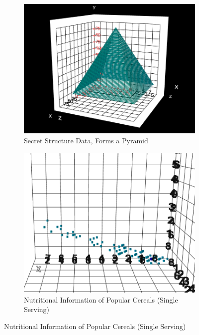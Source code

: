 \begin{figure}[hbt!]
    \centering
    \begin{subfigure}
        \centering
        \includegraphics[width=1\columnwidth]{author-files/figures/pyramid.PNG}
        \caption{Secret Structure Data, Forms a Pyramid}
        \label{fig:pyramid}
    \end{subfigure}
    \hfill
    \begin{subfigure}
        \centering
        \includegraphics[width=1\columnwidth]{author-files/figures/cerealdata.PNG}
        \caption{Nutritional Information of Popular Cereals (Single Serving)}
        \label{fig:cereal}
    \end{subfigure}
\end{figure}

